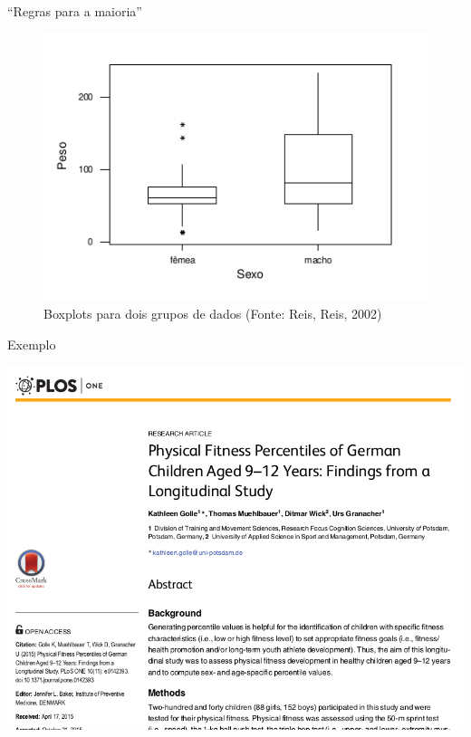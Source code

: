 \documentclass{beamer}
\begin{document}
\begin{frame}{``Regras para a maioria''}
  \begin{figure}
    \centering
    \includegraphics[height=0.7\textheight]{Desc_II/boxplot3}
    \caption{Boxplots para dois grupos de dados (Fonte: Reis, Reis,
      2002)}
  \end{figure}
\end{frame}

\begin{frame}{Exemplo}
  \begin{center}
    \includegraphics[height=\textheight]{Cap3/percentil0}
  \end{center}
\end{frame}
\end{document}
